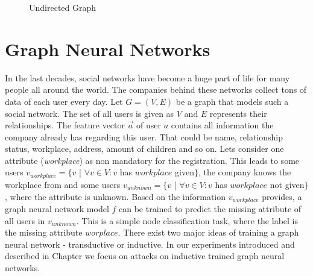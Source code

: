     \vspace{0.48cm}
    \begin{figure}[!h]
      \begin{center}
      \end{center}

      \caption{Undirected Graph}
      \label{figure:undirected-graph}
    \end{figure}

	\section{Graph Neural Networks}
      
    In the last decades, social networks have become a huge part of life for many people all around the world.
    The companies behind these networks collect tons of data of each user every day.
    Let $G = (V, E)$ be a graph that models such a social network. 
    The set of all users is given as $V$ and $E$ represents their relationships.
    The feature vector $\overrightarrow{a}$ of user $a$ contains all information the company already has regarding this user.
    That could be name, relationship status, workplace, address, amount of children and so on.
    Lets consider one attribute (\emph{workplace}) as non mandatory for the registration.
    This leads to some users $v_{workplace} = \{v $ | $ \forall v \in V: v$ has $workplace$ given$\}$, the company knows the workplace from and some users $v_{unknown} = \{v $ | $ \forall v \in V: v$ has $workplace$ not given$\}$, where the attribute is unknown.
    Based on the information $v_{workplace}$ provides, a graph neural network model $f$ can be trained to predict the missing attribute of all users in $v_{unknown}$.
    This is a simple node classification task, where the label is the missing attribute $worplace$.
    There exist two major ideas of training a graph neural network - transductive or inductive.
    In our experiments introduced and described in Chapter  we focus on attacks on inductive trained graph neural networks. 

